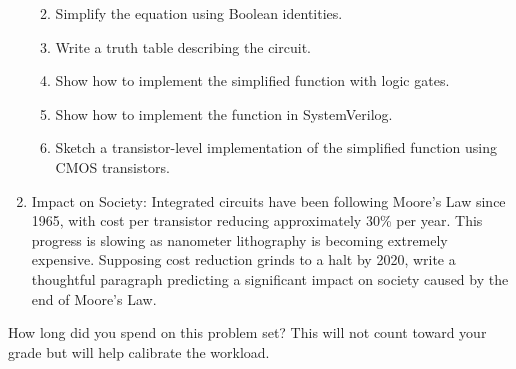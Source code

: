\documentclass{e85}
\begin{document}
\begin{enumerate}
\begin{enumerate}
    \begin{solution}

    \end{solution}

  \item Simplify the equation using Boolean identities.

    \begin{solution}

    \end{solution}

  \item Write a truth table describing the circuit.

    \begin{solution}

    \end{solution}

  \item Show how to implement the simplified function with logic
    gates.

    \begin{solution}

    \end{solution}

  \item Show how to implement the function in SystemVerilog.

    \begin{solution}

    \end{solution}

  \item Sketch a transistor-level implementation of the simplified
    function using CMOS transistors.

    \begin{solution}

    \end{solution}
  \end{enumerate}

\item Impact on Society: Integrated circuits have been following
  Moore's Law since 1965, with cost per transistor reducing
  approximately 30\% per year.  This progress is slowing as nanometer
  lithography is becoming extremely expensive.  Supposing cost
  reduction grinds to a halt by 2020, write a thoughtful paragraph
  predicting a significant impact on society caused by the end of
  Moore's Law.

  \begin{solution}

  \end{solution}

\end{enumerate}

How long did you spend on this problem set?  This will not count
toward your grade but will help calibrate the workload.
\end{document}
